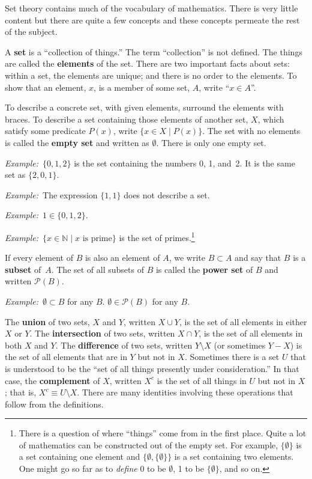 \documentclass[10pt, a4paper, twocolumn]{article}
\newcommand{\defn}[1]{\textbf{#1}}
\newcommand{\eg}{\emph{Example:}\relax}
\begin{document}
Set theory contains much of the vocabulary of mathematics. There is very little
content but there are quite a few concepts and these concepts permeate the rest
of the subject.

A \defn{set} is a “collection of things.” The term “collection” is not
defined. The things are called the \defn{elements} of the set. There are two
important facts about sets: within a set, the elements are unique; and there is
no order to the elements. To show that an element, $x$, is a member of some set,
$A$, write “$x \in A$”.

To describe a concrete set, with given elements, surround the elements with
braces. To describe a set containing those elements of another set, $X$, which
satisfy some predicate $P(x)$, write $\{x \in X \mid P(x)\}$. The set with no
elements is called the \defn{empty set} and written as $\emptyset$. There is only one
empty set.

\eg\ $\{0, 1, 2\}$ is the set containing the numbers 0, 1, and~2. It is the same
set as $\{2,0,1\}$.

\eg\ The expression $\{1, 1\}$ does not describe a set.

\eg\ $1\in\{0,1,2\}$.

\eg\ $\{x \in \mathbb{N} \mid \text{$x$ is prime}\}$ is the set of
primes.\footnote{There is a question of where “things” come from in the first place. Quite a lot of
  mathematics can be constructed out of the empty set. For example, $\{\emptyset\}$ is a set containing one
  element and $\{\emptyset, \{\emptyset\}\}$ is a set containing two elements. One might go so far as to \emph{define}
  0 to be $\emptyset$, 1 to be $\{\emptyset\}$, and so on.}

If every element of $B$ is also an element of $A$, we write $B \subset A$ and say that
$B$ is a \defn{subset} of~$A$. The set of all subsets of $B$ is called the
\defn{power set} of $B$ and written $\mathcal{P}(B)$.

\eg\ $\emptyset \subset B$ for any $B$. $\emptyset \in \mathcal{P}(B)$ for any $B$.

The \defn{union} of two sets, $X$ and $Y$, written $X \cup Y$, is the set of all
elements in either $X$ or $Y$. The \defn{intersection} of two sets, written $X \cap
Y$, is the set of all elements in both $X$ and $Y$. The \defn{difference} of two
sets, written $Y \setminus X$ (or sometimes $Y-X$) is the set of all elements that are
in $Y$ but not in $X$. Sometimes there is a set $U$ that is understood to be the
“set of all things presently under consideration.” In that case, the
\defn{complement} of $X$, written $X^c$ is the set of all things in $U$ but not
in $X$; that is, $X^c \equiv U \setminus X$. There are many identities involving these
operations that follow from the definitions.
\end{document}
